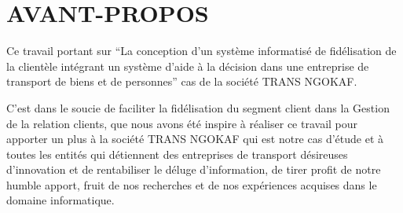 \chapter*{AVANT-PROPOS}
Ce travail portant sur \enquote{La conception d’un système informatisé de fidélisation
de la clientèle intégrant un système d’aide à la décision dans une entreprise de transport
de biens et de personnes} cas de la société TRANS NGOKAF.
\par
C’est dans le soucie de faciliter la fidélisation du segment client
dans la Gestion de la relation clients, que nous avons été inspire
à réaliser ce travail pour apporter un plus à la société TRANS NGOKAF
qui est notre cas d’étude et à toutes les entités qui détiennent des entreprises
de transport désireuses d’innovation et de rentabiliser le 
déluge d’information, de tirer profit de notre humble apport, fruit
de nos recherches et de nos expériences acquises dans le domaine informatique.
